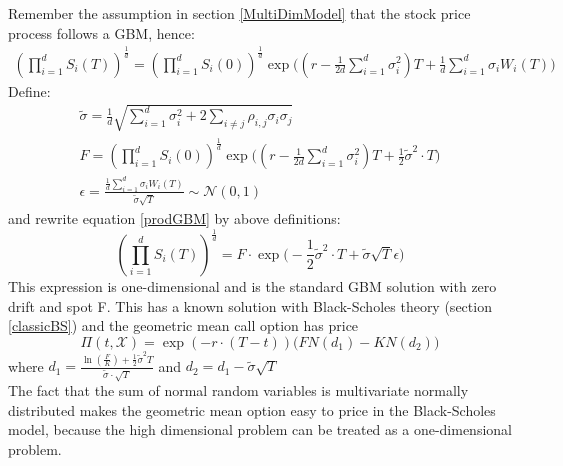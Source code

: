 Remember the assumption in section \ref{MultiDimModel} that the stock price process follows a GBM, hence:
\begin{equation}\label{prodGBM}
\begin{split}
(\prod_{i=1}^{d} S_i(T))^{\frac{1}{d}} = (\prod_{i=1}^{d} S_i(0))^{\frac{1}{d}} \exp\bigg((r-\frac{1}{2d}\sum_{i=1}^{d}\sigma_i^2)T + \frac{1}{d} \sum_{i=1}^{d} \sigma_i W_i(T) \bigg)
\end{split}
\end{equation}
Define:
\begin{align*}
\tilde{\sigma} = \frac{1}{d} \sqrt{\sum_{i=1}^{d} \sigma_i^2 + 2 \sum_{i\neq j} \rho_{i,j} \sigma_i \sigma_j}\\
F=(\prod_{i=1}^{d} S_i(0))^{\frac{1}{d}} \exp\bigg((r-\frac{1}{2d}\sum_{i=1}^{d}\sigma_i^2)T + \frac{1}{2} \tilde{\sigma}^2 \cdot T \bigg)\\
\epsilon = \frac{\frac{1}{d} \sum_{i=1}^{d} \sigma_i W_i(T)}{\tilde{\sigma} \sqrt{T}} \sim \mathcal{N}(0,1)
\end{align*}
and rewrite equation \eqref{prodGBM} by above definitions:
$$(\prod_{i=1}^{d} S_i(T))^{\frac{1}{d}} = F \cdot \exp\bigg( -\frac{1}{2} \tilde{\sigma}^2 \cdot T + \tilde{\sigma} \sqrt{T} \epsilon \bigg)$$
This expression is one-dimensional and is the standard GBM solution with zero drift and spot F. This has a known solution with Black-Scholes theory (section \ref{classicBS}) and the geometric mean call option has price
\begin{equation*}
\Pi(t,\mathcal{X})=\exp(-r \cdot (T-t))\bigg(F N(d_1) - K N(d_2) \bigg)
\end{equation*}
where $d_1=\frac{\ln(\frac{F}{K}) + \frac{1}{2} \tilde{\sigma}^2 T}{\tilde{\sigma} \cdot \sqrt{T}}$ and $d_2=d_1-\tilde{\sigma} \sqrt{T}$\\

The fact that the sum of normal random variables is multivariate normally distributed makes the geometric mean option easy to price in the Black-Scholes model, because the high dimensional problem can be treated as a one-dimensional problem.

